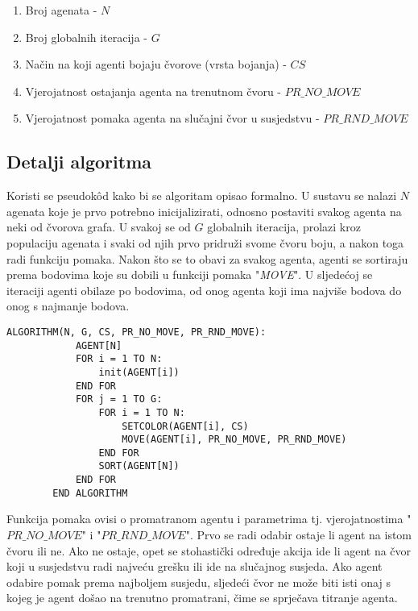 \documentclass[times, utf8, diplomski, numeric]{fer}
\begin{document}
\begin{enumerate}
	\item Broj agenata - $N$
	\item Broj globalnih iteracija - $G$
	\item Način na koji agenti bojaju čvorove (vrsta bojanja) - $CS$
	\item Vjerojatnost ostajanja agenta na trenutnom čvoru - $PR\_NO\_MOVE$
	\item Vjerojatnost pomaka agenta na slučajni čvor u susjedstvu - $PR\_RND\_MOVE$
\end{enumerate}

\subsection{Detalji algoritma}

Koristi se pseudok\^{o}d kako bi se algoritam opisao formalno. U sustavu se nalazi $N$ agenata koje je prvo potrebno inicijalizirati, odnosno postaviti svakog agenta na neki od čvorova grafa. U svakoj se od $G$ globalnih iteracija, prolazi kroz populaciju agenata i svaki od njih prvo pridruži svome čvoru boju, a nakon toga radi funkciju pomaka. Nakon što se to obavi za svakog agenta, agenti se sortiraju prema bodovima koje su dobili u funkciji pomaka "\emph{MOVE}". U sljedećoj se iteraciji agenti obilaze po bodovima, od onog agenta koji ima najviše bodova do onog s najmanje bodova.

\begin{singlespace}
	\begin{lstlisting}[caption=Pseudok\^{o}d agentskog algoritma]
		ALGORITHM(N, G, CS, PR_NO_MOVE, PR_RND_MOVE):
			AGENT[N]
			FOR i = 1 TO N:
				init(AGENT[i])
			END FOR
			FOR j = 1 TO G:
				FOR i = 1 TO N:
					SETCOLOR(AGENT[i], CS)
					MOVE(AGENT[i], PR_NO_MOVE, PR_RND_MOVE)
				END FOR
				SORT(AGENT[N])
			END FOR
		END ALGORITHM
	\end{lstlisting}
\end{singlespace}

Funkcija pomaka ovisi o promatranom agentu i parametrima tj. vjerojatnostima "$PR\_NO\_MOVE$" i "$PR\_RND\_MOVE$". Prvo se radi odabir ostaje li agent na istom čvoru ili ne. Ako ne ostaje, opet se stohastički određuje akcija ide li agent na čvor koji u susjedstvu radi najveću grešku ili ide na slučajnog susjeda. Ako agent odabire pomak prema najboljem susjedu, sljedeći čvor ne može biti isti onaj s kojeg je agent došao na trenutno promatrani, čime se sprječava titranje agenta.
\end{document}
